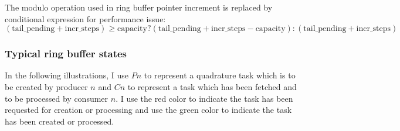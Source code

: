 \documentclass[11pt, a4paper]{book}
\begin{document}
\begin{mycomment}
  The modulo operation used in ring buffer pointer increment is replaced by conditional
  expression for performance issue:
  $$
  (\text{tail\_pending} + \text{incr\_steps}) \geq \text{capacity} ?
  (\text{tail\_pending} + \text{incr\_steps} - \text{capacity}) :
  (\text{tail\_pending} + \text{incr\_steps})
  $$
\end{mycomment}

\subsubsection{Typical ring buffer states}

In the following illustrations, I use $Pn$ to represent a quadrature task which is to be
created by producer $n$ and $Cn$ to represent a task which has been fetched and to be
processed by consumer $n$. I use the red color to indicate the task has been requested for
creation or processing and use the green color to indicate the task has been created or
processed.
\end{document}
